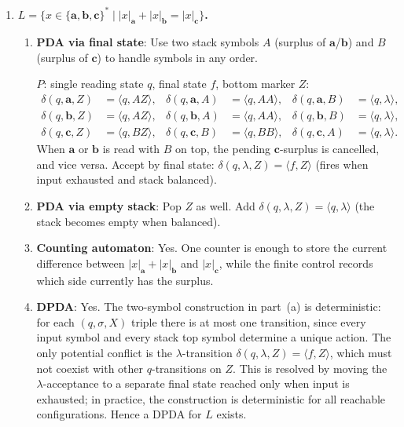 \begin{enumerate}[{10.}1. ]
\item \textbf{$L=\{x\in\{\pmb{a},\pmb{b},\pmb{c}\}^* \mid |x|_{\pmb{a}}+|x|_{\pmb{b}}=|x|_{\pmb{c}}\}$.}

\begin{enumerate}
\item \textbf{PDA via final state}: Use two stack symbols $A$ (surplus of $\pmb{a}$/$\pmb{b}$) and $B$ (surplus of $\pmb{c}$) to handle symbols in any order.

$P$: single reading state $q$, final state $f$, bottom marker $Z$:
\begin{align*}
\delta(q,\pmb{a},Z)&=\langle q,AZ\rangle, & \delta(q,\pmb{a},A)&=\langle q,AA\rangle, & \delta(q,\pmb{a},B)&=\langle q,\lambda\rangle,\\
\delta(q,\pmb{b},Z)&=\langle q,AZ\rangle, & \delta(q,\pmb{b},A)&=\langle q,AA\rangle, & \delta(q,\pmb{b},B)&=\langle q,\lambda\rangle,\\
\delta(q,\pmb{c},Z)&=\langle q,BZ\rangle, & \delta(q,\pmb{c},B)&=\langle q,BB\rangle, & \delta(q,\pmb{c},A)&=\langle q,\lambda\rangle.
\end{align*}
When $\pmb{a}$ or $\pmb{b}$ is read with $B$ on top, the pending $\pmb{c}$-surplus is cancelled, and vice versa.
Accept by final state: $\delta(q,\lambda,Z)=\langle f,Z\rangle$ (fires when input exhausted and stack balanced).

\item \textbf{PDA via empty stack}: Pop $Z$ as well. Add $\delta(q,\lambda,Z)=\langle q,\lambda\rangle$ (the stack becomes empty when balanced).

\item \textbf{Counting automaton}: Yes. One counter is enough to store the current difference between $|x|_{\pmb{a}}+|x|_{\pmb{b}}$ and $|x|_{\pmb{c}}$, while the finite control records which side currently has the surplus.

\item \textbf{DPDA}: Yes. The two-symbol construction in part~(a) is deterministic: for each $(q, \sigma, X)$ triple there is at most one transition, since every input symbol and every stack top symbol determine a unique action. The only potential conflict is the $\lambda$-transition $\delta(q,\lambda,Z)=\langle f,Z\rangle$, which must not coexist with other $q$-transitions on $Z$. This is resolved by moving the $\lambda$-acceptance to a separate final state reached only when input is exhausted; in practice, the construction is deterministic for all reachable configurations. Hence a DPDA for $L$ exists.


\end{enumerate}
\end{enumerate}
